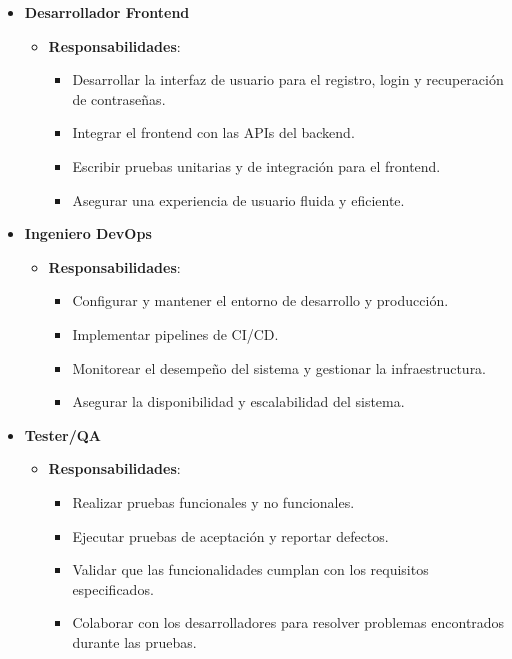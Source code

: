 \begin{itemize}
    \item \textbf{Desarrollador Frontend}
          \begin{itemize}
              \item \textbf{Responsabilidades}:
                    \begin{itemize}
                        \item Desarrollar la interfaz de usuario para el registro, login y recuperación de contraseñas.
                        \item Integrar el frontend con las APIs del backend.
                        \item Escribir pruebas unitarias y de integración para el frontend.
                        \item Asegurar una experiencia de usuario fluida y eficiente.
                    \end{itemize}
          \end{itemize}

    \item \textbf{Ingeniero DevOps}
          \begin{itemize}
              \item \textbf{Responsabilidades}:
                    \begin{itemize}
                        \item Configurar y mantener el entorno de desarrollo y producción.
                        \item Implementar pipelines de CI/CD.
                        \item Monitorear el desempeño del sistema y gestionar la infraestructura.
                        \item Asegurar la disponibilidad y escalabilidad del sistema.
                    \end{itemize}
          \end{itemize}

    \item \textbf{Tester/QA}
          \begin{itemize}
              \item \textbf{Responsabilidades}:
                    \begin{itemize}
                        \item Realizar pruebas funcionales y no funcionales.
                        \item Ejecutar pruebas de aceptación y reportar defectos.
                        \item Validar que las funcionalidades cumplan con los requisitos especificados.
                        \item Colaborar con los desarrolladores para resolver problemas encontrados durante las pruebas.
                    \end{itemize}
          \end{itemize}
\end{itemize}

